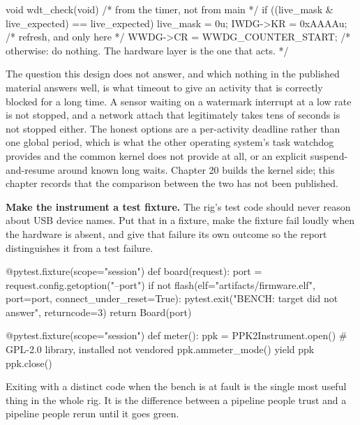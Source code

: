 \begin{steps}
\begin{ccode}
void wdt_check(void)                        /* from the timer, not from main  */
{
    if ((live_mask & live_expected) == live_expected) {
        live_mask = 0u;
        IWDG->KR = 0xAAAAu;                 /* refresh, and only here        */
        WWDG->CR = WWDG_COUNTER_START;
    }
    /* otherwise: do nothing. The hardware layer is the one that acts.       */
}
\end{ccode}
The question this design does not answer, and which nothing in the published
material answers well, is what timeout to give an activity that is correctly
blocked for a long time. A sensor waiting on a watermark interrupt at a low rate
is not stopped, and a network attach that legitimately takes tens of seconds is
not stopped either. The honest options are a per-activity deadline rather than
one global period, which is what the other operating system's task watchdog
provides and the common kernel does not provide at all, or an explicit
suspend-and-resume around known long waits. Chapter 20 builds the kernel side;
this chapter records that the comparison between the two has not been published.

\item \textbf{Make the instrument a test fixture.} The rig's test code should
never reason about USB device names. Put that in a fixture, make the fixture
fail loudly when the hardware is absent, and give that failure its own outcome
so the report distinguishes it from a test failure.
\begin{pycode}
@pytest.fixture(scope="session")
def board(request):
    port = request.config.getoption("--port")
    if not flash(elf="artifacts/firmware.elf", port=port, connect_under_reset=True):
        pytest.exit("BENCH: target did not answer", returncode=3)
    return Board(port)

@pytest.fixture(scope="session")
def meter():
    ppk = PPK2Instrument.open()          # GPL-2.0 library, installed not vendored
    ppk.ammeter_mode()
    yield ppk
    ppk.close()
\end{pycode}
Exiting with a distinct code when the bench is at fault is the single most
useful thing in the whole rig. It is the difference between a pipeline people
trust and a pipeline people rerun until it goes green.


\end{steps}
